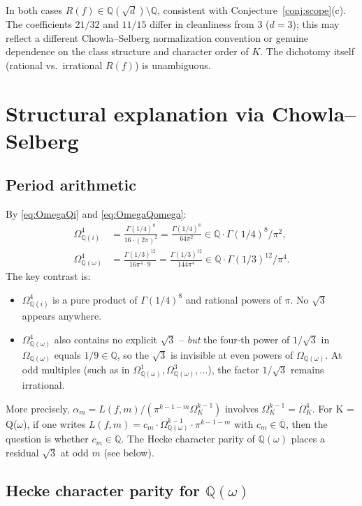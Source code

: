 \documentclass[10pt]{article}
\theoremstyle{definition}
\newcommand{\Q}{\mathbb{Q}}
\newcommand{\OmK}{\Omega_K}
\newcommand{\OmI}{\Omega_{\Q(i)}}
\newcommand{\OmW}{\Omega_{\Q(\omega)}}
\begin{document}
In both cases $R(f) \in \Q(\sqrt{d})\setminus\Q$, consistent with
Conjecture~\ref{conj:scope}(c).  The coefficients $21/32$ and $11/15$ differ in
cleanliness from $3$ ($d=3$); this may reflect a different Chowla--Selberg
normalization convention or genuine dependence on the class structure and
character order of $K$.  The dichotomy itself (rational vs.\ irrational $R(f)$)
is unambiguous.


\section{Structural explanation via Chowla--Selberg}
\label{sec:structure}

\subsection{Period arithmetic}

By \eqref{eq:OmegaQi} and \eqref{eq:OmegaQomega}:
\begin{align}
  \OmI^4 &= \frac{\Gamma(1/4)^8}{16\cdot(2\pi)^2}
           = \frac{\Gamma(1/4)^8}{64\pi^2} \in \Q\cdot \Gamma(1/4)^8/\pi^2, \\
  \OmW^4 &= \frac{\Gamma(1/3)^{12}}{16\pi^4\cdot 9}
           = \frac{\Gamma(1/3)^{12}}{144\pi^4} \in \Q\cdot \Gamma(1/3)^{12}/\pi^4.
\end{align}
The key contrast is:
\begin{itemize}
  \item $\OmI^4$ is a pure product of $\Gamma(1/4)^8$ and rational powers of $\pi$.
        No $\sqrt{3}$ appears anywhere.
  \item $\OmW^4$ also contains no explicit $\sqrt{3}$ -- \emph{but} the four-th power
        of $1/\sqrt{3}$ in $\OmW$ equals $1/9 \in \Q$, so the $\sqrt{3}$ is invisible
        at even powers of $\OmW$.  At odd multiples (such as in $\OmW^1, \OmW^3, \ldots$),
        the factor $1/\sqrt{3}$ remains irrational.
\end{itemize}

More precisely, $\alpha_m = L(f,m)/(\pi^{k-1-m}\OmK^{k-1})$ involves $\OmK^{k-1}
= \OmK^4$.  For K = Q($\omega$), if one writes $L(f,m) = c_m \cdot \OmW^{k-1} \cdot \pi^{k-1-m}$
with $c_m \in \overline{\Q}$, then the question is whether $c_m \in \Q$.  The Hecke
character parity of $\Q(\omega)$ places a residual $\sqrt{3}$ at odd $m$ (see below).

\subsection{Hecke character parity for \texorpdfstring{$\Q(\omega)$}{Q(omega)}}
\end{document}
